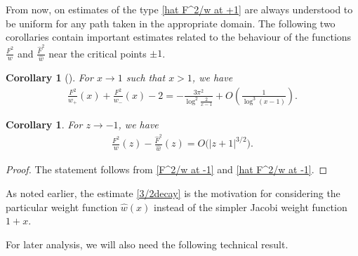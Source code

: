 \documentclass[11pt]{article}
\numberwithin{equation}{section}
\newcommand{\hw}{\widehat w}
\newcommand{\hF}{\widehat F}
\newcommand{\Fw}{\frac{F^2}{w}}
\newcommand{\hFw}{\frac{\hF^2}{\hw}}
\newtheorem{Corollary}[Theorem]{Corollary}
\numberwithin{equation}{section}
\begin{document}
From now, on estimates of the type \eqref{hat F^2/w at +1} are always understood to be uniform for any path taken in the appropriate domain. The following two corollaries contain important estimates related to the behaviour of the functions $\Fw$ and $\hFw$ near the critical points $\pm 1$.
\begin{Corollary}[{\cite[Proposition~2.4]{CD}}]\label{CorF+1} For $x \to 1$ such that $x > 1$, we have
\begin{align}\label{Diff F^2/w at +1}
\frac{F^2}{w_+}(x)+\frac{F^2}{w_-}(x) - 2 = - \frac{3\pi^2}{\log^2 \frac{2}{x-1}} + O\left(\frac{1}{\log^3(x-1)}\right).
\end{align}
\end{Corollary}

\begin{Corollary}\label{CorF-1}
 For $z \to -1$, we have
\begin{align}\label{3/2decay}
 \Fw(z)-\hFw(z) = O\big(|z+1|^{3/2}\big).
\end{align}
\end{Corollary}
\begin{proof}
The statement follows from \eqref{F^2/w at -1} and \eqref{hat F^2/w at -1}.
\end{proof}

\begin{Remark}
As noted earlier, the estimate \eqref{3/2decay} is the motivation for considering the particular weight function $\hw(x)$ instead of the simpler Jacobi weight function $1+x$.
\end{Remark}

For later analysis, we will also need the following technical result.
\end{document}
